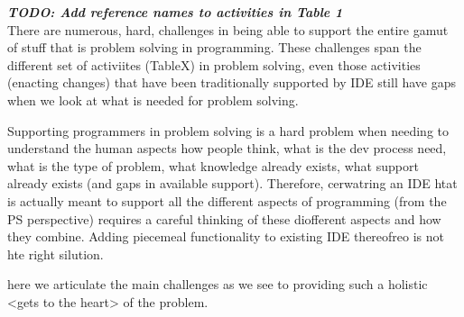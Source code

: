 \documentclass{ppig}
\newcommand{\todo}[1]{\textit{\textbf{\color{red}TODO: #1}}} %
\begin{document}
\todo{Add reference names to activities in Table 1\\}
There are numerous, hard, challenges in being able to support the entire gamut of stuff that is problem solving in programming.
These challenges span the different set of activiites (TableX) in problem solving, even those activities (enacting changes) that have been traditionally supported by IDE still have gaps when we look at what is needed for problem solving.

Supporting programmers in problem solving is a hard problem when needing to understand the human aspects how people think, what is the dev process need, what is the type of problem, what knowledge already exists, what support already exists (and gaps in available support). Therefore, cerwatring an IDE htat is actually meant to support all the different aspects of programming (from the PS perspective) requires a careful thinking of these diofferent aspects and how they combine. Adding piecemeal functionality to existing IDE thereofreo is not hte right silution.

here we articulate the main challenges as we see to providing such a holistic <gets to the heart> of the problem.
\end{document}
